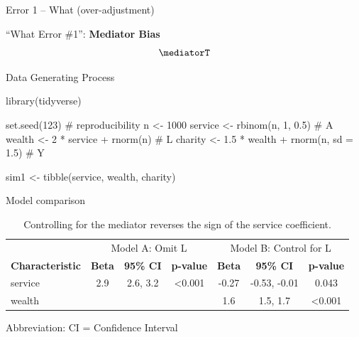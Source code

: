 \documentclass[
  ignorenonframetext,
  aspectratio=169,
]{beamer}
\newenvironment{Shaded}{\begin{snugshade}}{\end{snugshade}}
\newcommand{\AttributeTok}[1]{\textcolor[rgb]{0.40,0.45,0.13}{#1}}
\newcommand{\CommentTok}[1]{\textcolor[rgb]{0.37,0.37,0.37}{#1}}
\newcommand{\DecValTok}[1]{\textcolor[rgb]{0.68,0.00,0.00}{#1}}
\newcommand{\FloatTok}[1]{\textcolor[rgb]{0.68,0.00,0.00}{#1}}
\newcommand{\FunctionTok}[1]{\textcolor[rgb]{0.28,0.35,0.67}{#1}}
\newcommand{\NormalTok}[1]{\textcolor[rgb]{0.00,0.23,0.31}{#1}}
\newcommand{\OtherTok}[1]{\textcolor[rgb]{0.00,0.23,0.31}{#1}}
\newcommand{\SpecialCharTok}[1]{\textcolor[rgb]{0.37,0.37,0.37}{#1}}
\begin{document}
\begin{frame}[fragile]{Error 1 -- What (over-adjustment)}
\label{error-1-what-over-adjustment}
\begin{block}{``What Error \#1'': \textbf{Mediator Bias}}
\label{what-error-1-mediator-bias}
\[\mediatorT\]
\end{block}

\begin{block}{Data Generating Process}
\label{data-generating-process}
\begin{Shaded}
\begin{Highlighting}[]
\FunctionTok{library}\NormalTok{(tidyverse)}

\FunctionTok{set.seed}\NormalTok{(}\DecValTok{123}\NormalTok{)                           }\CommentTok{\# reproducibility}
\NormalTok{n        }\OtherTok{\textless{}{-}} \DecValTok{1000}
\NormalTok{service  }\OtherTok{\textless{}{-}} \FunctionTok{rbinom}\NormalTok{(n, }\DecValTok{1}\NormalTok{, }\FloatTok{0.5}\NormalTok{)          }\CommentTok{\# A}
\NormalTok{wealth   }\OtherTok{\textless{}{-}} \DecValTok{2} \SpecialCharTok{*}\NormalTok{ service }\SpecialCharTok{+} \FunctionTok{rnorm}\NormalTok{(n)     }\CommentTok{\# L}
\NormalTok{charity  }\OtherTok{\textless{}{-}} \FloatTok{1.5} \SpecialCharTok{*}\NormalTok{ wealth }\SpecialCharTok{+} \FunctionTok{rnorm}\NormalTok{(n, }\AttributeTok{sd =} \FloatTok{1.5}\NormalTok{)  }\CommentTok{\# Y}

\NormalTok{sim1 }\OtherTok{\textless{}{-}} \FunctionTok{tibble}\NormalTok{(service, wealth, charity)}
\end{Highlighting}
\end{Shaded}
\end{block}

\begin{block}{Model comparison}
\label{model-comparison}
\begin{table}
\caption{Controlling for the mediator reverses the sign of the service
coefficient.}\tabularnewline

\fontsize{12.0pt}{14.4pt}\selectfont
\begin{tabular*}{\linewidth}{@{\extracolsep{\fill}}lcccccc}
\toprule
 & \multicolumn{3}{c}{Model A: Omit L} & \multicolumn{3}{c}{Model B: Control for L} \\ 
\cmidrule(lr){2-4} \cmidrule(lr){5-7}
\textbf{Characteristic} & \textbf{Beta} & \textbf{95\% CI} & \textbf{p-value} & \textbf{Beta} & \textbf{95\% CI} & \textbf{p-value} \\ 
\midrule\addlinespace[2.5pt]
service & 2.9 & 2.6, 3.2 & <0.001 & -0.27 & -0.53, -0.01 & 0.043 \\ 
wealth &  &  &  & 1.6 & 1.5, 1.7 & <0.001 \\ 
\bottomrule
\end{tabular*}
\begin{minipage}{\linewidth}
Abbreviation: CI = Confidence Interval\\
\end{minipage}
\end{table}
\end{block}


\end{frame}
\end{document}
